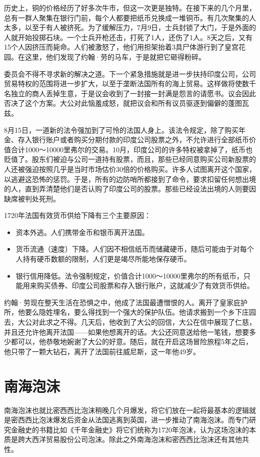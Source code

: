 \documentclass[12pt,oneside]{book}
\begin{document}
\begin{mdframed}
历史上，铜的价格经历了好多次牛市，但这一次更是独特。在接下来的几个月里，总有一群人聚集在银行门前，每个人都要把纸币兑换成一堆铜币。有几次聚集的人太多，以至于有人被挤死。为了缓解压力，7月9日，士兵封锁了大门，于是外面的人就开始投掷石块。一个士兵开枪还击，打死了1人，还伤了1人。8天之后，又有15个人因挤压而毙命。人们被激怒了，他们用担架抬着3具尸体游行到了皇宫花园。在这里，他们发现了约翰·劳的马车，于是就把它砸得粉碎。

委员会不得不寻求新的解决之道。下一个紧急措施就是进一步扶持印度公司，公司贸易特权的范围将进一步扩大，以至于垄断法国所有的海上贸易。这样做将使数千名独立的商人丢掉生意，于是议会收到了一封接一封满是怨言的请愿书。议会因此否决了这个方案。大公对此恼羞成怒，就把议会和所有议员驱逐到偏僻的蓬图瓦兹。

8月15日，一道新的法令强加到了可怜的法国人身上。该法令规定，除了购买年金、存入银行账户或者购买分期付款的印度公司股票之外，不允许进行全部纸币价值合计1000～10000里弗尔的交易。10月，印度公司的许多特权被拿掉了，纸币也贬值了。股东们被迫与公司一道持有股票，而且，那些已经同意购买公司新股票的人还被强迫按照几乎是当时市场估价30倍的价格购买。许多人试图离开这个国家，以逃避这恐怖的惩罚。于是，所有的边防哨所都接到了命令，要求扣留任何想出境的人，直到弄清楚他们是否认购了印度公司的股票。那些已经设法出境的人则要因缺席被判处死刑。

1720年法国有效货币供给下降有三个主要原因：

\begin{itemize}
\item 资本外逃。人们携带金币和银币离开法国。
\item 货币流通（速度）下降。人们因不相信纸币而储藏硬币，随后可能由于对每个人持有硬币数额的限制，人们更是竭尽所能地保存硬币。
\item 银行信用降低。法令强制规定，价值合计1000～10000里弗尔的所有纸币，只能用来购买债券、印度公司股票和存入银行账户，这就减少了有效货币供给。
\end{itemize}

约翰·劳现在整天生活在恐惧之中，他成了法国最遭憎恨的人。离开了皇家庇护所，他要么隐姓埋名，要么得找到一个强大的保护队伍。他请求搬到一个乡下庄园去，大公对此求之不得。几天后，他收到了大公的回信，大公在信中展现了仁慈，并且还允许他离开法国——如果他想离开的话。大公还同意送给他一笔钱，想要多少都可以，他恭敬地婉谢了大公的好意。随后，就在开启这场冒险旅程5年之后，他只带了一颗大钻石，离开了法国前往威尼斯，这一年他49岁。
\end{mdframed}

\section{南海泡沫}
南海泡沫也就比密西西比泡沫稍晚几个月爆发，将它们放在一起将最基本的逻辑就是密西西比泡沫爆发后资金从法国逃离到英国，进一步推动了南海泡沫。而专门研究金融史的书籍比如《千年金融史》将它们统称为1720年泡沫，认为这场泡沫的本质是跨大西洋贸易股份公司泡沫。除此之外南海泡沫和密西西比泡沫还有其他共性。
\end{document}
